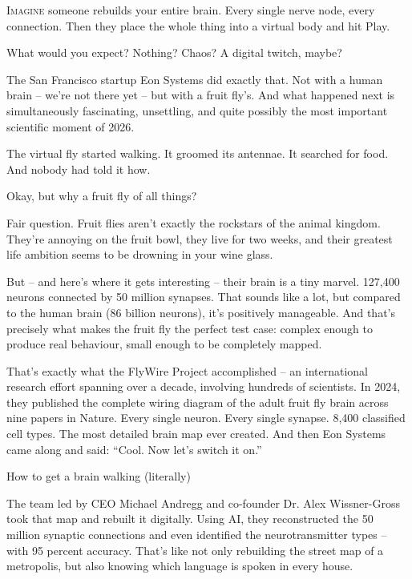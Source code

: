 \documentclass[9pt,a4paper]{extarticle}
\makeatletter
\newlength{\newsleading}
\renewcommand{\subsection}[1]{%
  \par\addpenalty{\@secpenalty}\addvspace{\newsleading}%
  \begingroup
    \sffamily\bfseries\fontsize{8}{\newsleading}\selectfont
    \interlinepenalty=10000
    \noindent\strut #1\strut\par
  \endgroup
  \nobreak\@afterindentfalse\@afterheading
}
\makeatother
\begin{document}
\fontsize{9.5}{\newsleading}\selectfont
\lineskiplimit=-1000pt

\linenumbers\lettrine[lines=4,lhang=0.05,nindent=0pt]{I}{magine} someone rebuilds your entire brain. Every single nerve node, every connection. Then they place the whole thing into a virtual body and hit Play.

What would you expect? Nothing? Chaos? A digital twitch, maybe?

The San Francisco startup Eon Systems did exactly that. Not with a human brain – we’re not there yet – but with a fruit fly’s. And what happened next is simultaneously fascinating, unsettling, and quite possibly the most important scientific moment of 2026.

The virtual fly started walking. It groomed its antennae. It searched for food. And nobody had told it how.

\subsection{Okay, but why a fruit fly of all things?}
Fair question. Fruit flies aren’t exactly the rockstars of the animal kingdom. They’re annoying on the fruit bowl, they live for two weeks, and their greatest life ambition seems to be drowning in your wine glass.

But – and here’s where it gets interesting – their brain is a tiny marvel. 127,400 neurons connected by 50 million synapses. That sounds like a lot, but compared to the human brain (86 billion neurons), it’s positively manageable. And that’s precisely what makes the fruit fly the perfect test case: complex enough to produce real behaviour, small enough to be completely mapped.

That’s exactly what the FlyWire Project accomplished – an international research effort spanning over a decade, involving hundreds of scientists. In 2024, they published the complete wiring diagram of the adult fruit fly brain across nine papers in Nature. Every single neuron. Every single synapse. 8,400 classified cell types. The most detailed brain map ever created. And then Eon Systems came along and said: “Cool. Now let’s switch it on.”

\subsection{How to get a brain walking (literally)}
The team led by CEO Michael Andregg and co-founder Dr. Alex Wissner-Gross took that map and rebuilt it digitally. Using AI, they reconstructed the 50 million synaptic connections and even identified the neurotransmitter types – with 95 percent accuracy. That’s like not only rebuilding the street map of a metropolis, but also knowing which language is spoken in every house.
\end{document}
